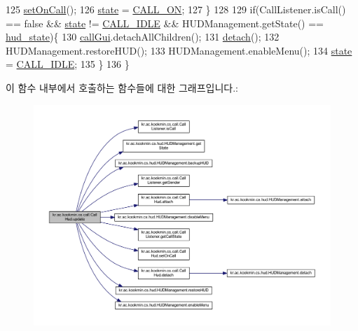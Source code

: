 \begin{DoxyCode}
125       \hyperlink{classkr_1_1ac_1_1kookmin_1_1cs_1_1call_1_1_call_hud_aa034521baf8a85af36a375906c693e47}{setOnCall}();
126       \hyperlink{classkr_1_1ac_1_1kookmin_1_1cs_1_1call_1_1_call_hud_a205351e41055a51d9b1d33ee0c6d84f1}{state} = \hyperlink{classkr_1_1ac_1_1kookmin_1_1cs_1_1call_1_1_call_hud_a78497626e7b91b6242225fb43517868e}{CALL\_ON};
127     \}
128 
129     \textcolor{keywordflow}{if}(CallListener.isCall() == \textcolor{keyword}{false} && \hyperlink{classkr_1_1ac_1_1kookmin_1_1cs_1_1call_1_1_call_hud_a205351e41055a51d9b1d33ee0c6d84f1}{state} != \hyperlink{classkr_1_1ac_1_1kookmin_1_1cs_1_1call_1_1_call_hud_acc23c947c0a464d1c09b04666057e8fc}{CALL\_IDLE} && HUDManagement.getState() == 
      \hyperlink{classkr_1_1ac_1_1kookmin_1_1cs_1_1call_1_1_call_hud_af5388605062cf82753266c23f663e2eb}{hud\_state})\{
130       \hyperlink{classkr_1_1ac_1_1kookmin_1_1cs_1_1call_1_1_call_hud_a04c754bf3f77ab819160e0769e5ef468}{callGui}.detachAllChildren();
131       \hyperlink{classkr_1_1ac_1_1kookmin_1_1cs_1_1call_1_1_call_hud_a3f58fc64836793d7010a1d46fa787e0d}{detach}();
132       HUDManagement.restoreHUD();
133       HUDManagement.enableMenu();
134       \hyperlink{classkr_1_1ac_1_1kookmin_1_1cs_1_1call_1_1_call_hud_a205351e41055a51d9b1d33ee0c6d84f1}{state} = \hyperlink{classkr_1_1ac_1_1kookmin_1_1cs_1_1call_1_1_call_hud_acc23c947c0a464d1c09b04666057e8fc}{CALL\_IDLE};
135     \}
136   \}
\end{DoxyCode}


이 함수 내부에서 호출하는 함수들에 대한 그래프입니다.\+:\nopagebreak
\begin{figure}[H]
\begin{center}
\leavevmode
\includegraphics[width=350pt]{classkr_1_1ac_1_1kookmin_1_1cs_1_1call_1_1_call_hud_a28fc0dce1114387424d56d65aee6b304_cgraph}
\end{center}
\end{figure}




